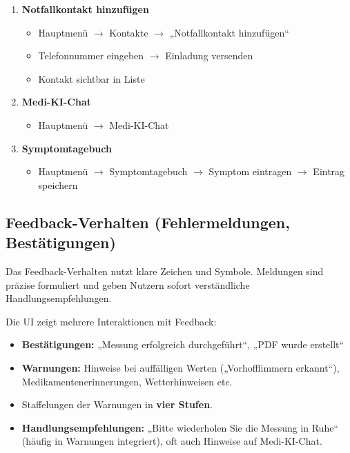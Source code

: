 \begin{enumerate}
	\item \textbf{Notfallkontakt hinzufügen}
	\begin{itemize}
		\item Hauptmenü $\rightarrow$ Kontakte $\rightarrow$ „Notfallkontakt hinzufügen“
		\item Telefonnummer eingeben $\rightarrow$ Einladung versenden
		\item Kontakt sichtbar in Liste
	\end{itemize}
	
	\item \textbf{Medi-KI-Chat}
	\begin{itemize}
		\item Hauptmenü $\rightarrow$ Medi-KI-Chat
	\end{itemize}
	
	\item \textbf{Symptomtagebuch}
	\begin{itemize}
		\item Hauptmenü $\rightarrow$ Symptomtagebuch $\rightarrow$ Symptom eintragen $\rightarrow$ Eintrag speichern
	\end{itemize}
\end{enumerate}

\subsection{Feedback-Verhalten (Fehlermeldungen, Bestätigungen)}
Das Feedback-Verhalten nutzt klare Zeichen und Symbole. Meldungen sind präzise formuliert und geben Nutzern sofort verständliche Handlungsempfehlungen.

Die UI zeigt mehrere Interaktionen mit Feedback:
\begin{itemize}
	\item \textbf{Bestätigungen:} „Messung erfolgreich durchgeführt“, „PDF wurde erstellt“
	\item \textbf{Warnungen:} Hinweise bei auffälligen Werten („Vorhofflimmern erkannt“), Medikamentenerinnerungen, Wetterhinweisen etc.
	\item Staffelungen der Warnungen in \textbf{vier Stufen}.
	\item \textbf{Handlungsempfehlungen:} „Bitte wiederholen Sie die Messung in Ruhe“ (häufig in Warnungen integriert), oft auch Hinweise auf Medi-KI-Chat.
\end{itemize}

\newpage
